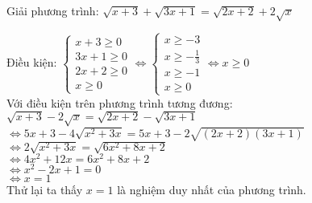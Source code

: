 \begin{baitap}
 Giải phương trình: $ \sqrt{x+3 } + \sqrt{3x +1 } = \sqrt{2x+2 } + 2 \sqrt{ x}     $
\begin{loigiai1}
Điều kiện: $ \begin{cases}
    x +3 \geq 0 \\
    3x +1 \geq 0 \\
    2x +2 \geq 0 \\
    x \geq 0
\end{cases} 
\Leftrightarrow 
    \begin{cases}
        x \geq -3 \\
        x \geq - \frac{1}{3} \\
        x \geq -1 \\
        x \geq 0
    \end{cases} \Leftrightarrow x \geq 0 $ \\
    Với điều kiện trên phương trình tương đương: \\
    $ \sqrt{x+3 } - 2 \sqrt{x } = \sqrt{2x +2 } - \sqrt{3x + 1} $ \\
    $ \Leftrightarrow 5x +3 -4 \sqrt{x^2 + 3x } = 5x + 3 - 2 \sqrt{(2x+2)(3x+1)}$ \\
    $ \Leftrightarrow 2 \sqrt{x^2 + 3x } = \sqrt{6x^2 + 8x + 2 } $ \\
    $ \Leftrightarrow 4x^2 + 12x = 6x^2 + 8x + 2 $ \\
    $ \Leftrightarrow x^2 -2x +1 =0 $ \\
    $ \Leftrightarrow x = 1 $ \\
    Thử lại ta thấy $x=1$ là nghiệm duy nhất của phương trình.
\end{loigiai1}

\end{baitap}
